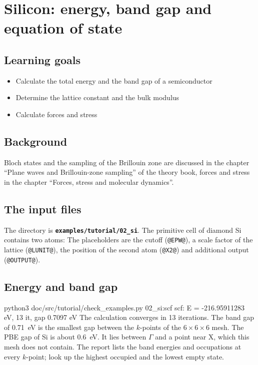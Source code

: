 \documentclass[11pt,a4paper,oneside]{book}
\newcommand{\file}[1]{\textbf{\texttt{#1}}}
\newenvironment{shell}{\small\verbatim}{\endverbatim}
\newcommand{\deck}[1]{{\small}}
\newcommand{\goals}{\section{Learning goals}}
\newcommand{\background}{\section{Background}}
\begin{document}
\chapter{Silicon: energy, band gap and equation of state}
\minitoc

\goals
\begin{itemize}
\item Calculate the total energy and the band gap of a semiconductor
\item Determine the lattice constant and the bulk modulus
\item Calculate forces and stress
\end{itemize}

\background
Bloch states and the sampling of the Brillouin zone are discussed in
the chapter ``Plane waves and Brillouin-zone sampling'' of the theory
book, forces and stress in the chapter ``Forces, stress and molecular
dynamics''.

\section{The input files}

The directory is \file{examples/tutorial/02\_si}. The primitive cell of
diamond Si contains two atoms:
\deck{../../../examples/tutorial/02_si/si.strc}
\deck{../../../examples/tutorial/02_si/si.cntl}
The placeholders are the cutoff (\texttt{@EPW@}), a scale factor of the
lattice (\texttt{@LUNIT@}), the position of the second atom
(\texttt{@X2@}) and additional output (\texttt{@OUTPUT@}).

\section{Energy and band gap}

\begin{shell}
python3 doc/src/tutorial/check_examples.py 02_si:scf
    scf: E = -216.95911283 eV, 13 it, gap 0.7097 eV
\end{shell}
The calculation converges in 13 iterations. The band gap of 0.71~eV is
the smallest gap between the $k$-points of the $6\times6\times6$ mesh.
The PBE gap of Si is about 0.6~eV. It lies between $\Gamma$ and a point
near X, which this mesh does not contain. The report lists the band
energies and occupations at every $k$-point; look up the highest
occupied and the lowest empty state.
\end{document}
